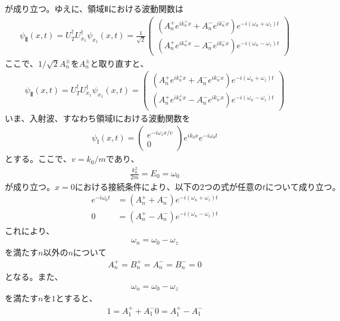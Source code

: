 が成り立つ。ゆえに、領域Ⅱにおける波動関数は
\begin{align}
{\psi}_{Ⅱ}(x,t)=U_{T}^{\dagger}U_{x_{1}}^{\dagger}{\psi}_{x_{1}}(x,t)=\frac{1}{\sqrt{2}}
\begin{pmatrix}
\left(A_{n}^{+}e^{ik_{n}^{+}x}+A_{n}^{-}e^{ik_{n}^{-}x}\right)e^{-i(\omega_{n}+\omega_{z})t} \\
\left(A_{n}^{+}e^{ik_{n}^{+}x}-A_{n}^{-}e^{ik_{n}^{-}x}\right)e^{-i(\omega_{n}-\omega_{z})t}
\end{pmatrix}
\end{align}
$ここで、1/{\sqrt{2}}A_{n}^{\pm}をA_{n}^{\pm}と取り直すと、$
\begin{align}
{\psi}_{Ⅱ}(x,t)=U_{T}^{\dagger}U_{x_{1}}^{\dagger}{\psi}_{x_{1}}(x,t)=
\begin{pmatrix}
\left(A_{n}^{+}e^{ik_{n}^{+}x}+A_{n}^{-}e^{ik_{n}^{-}x}\right)e^{-i(\omega_{n}+\omega_{z})t} \\
\left(A_{n}^{+}e^{ik_{n}^{+}x}-A_{n}^{-}e^{ik_{n}^{-}x}\right)e^{-i(\omega_{n}-\omega_{z})t}
\end{pmatrix}
\end{align}
いま、入射波、すなわち領域Ⅰにおける波動関数を
\begin{align}
{\psi}_{Ⅰ}(x,t)=
\begin{pmatrix}
e^{-i\omega_{z}x/v} \\
0
\end{pmatrix}
e^{ik_{0}x}e^{-i\omega_{0}t}
\end{align}
$とする。ここで、v={k_{0}}/{m}であり、$
\begin{align}
\frac{k_{0}^2}{2m}=E_{0}=\omega_{0}
\end{align}
$が成り立つ。x=0における接続条件により、以下の2つの式が任意のtについて成り立つ。$
\begin{align}
e^{-i\omega_{0}t}&=\left(A_{n}^{+}+A_{n}^{-}\right)e^{-i(\omega_{n}+\omega_{z})t} \\
0&=\left(A_{n}^{+}-A_{n}^{-}\right)e^{-i(\omega_{n}-\omega_{z})t}
\end{align}
これにより、
\begin{align}
\omega_{n}=\omega_{0}-\omega_{z}
\end{align}
$を満たすn以外のnについて$
\begin{align}
A_{n}^{+}=B_{n}^{+}=A_{n}^{-}=B_{n}^{-}=0
\end{align}
となる。また、
\begin{align}
\omega_{n}=\omega_{0}-\omega_{z}
\end{align}
$を満たすnを1とすると、$
\begin{align}
1=A_{1}^{+}+A_{1}^{-}
0=A_{1}^{+}-A_{1}^{-}
\end{align}
